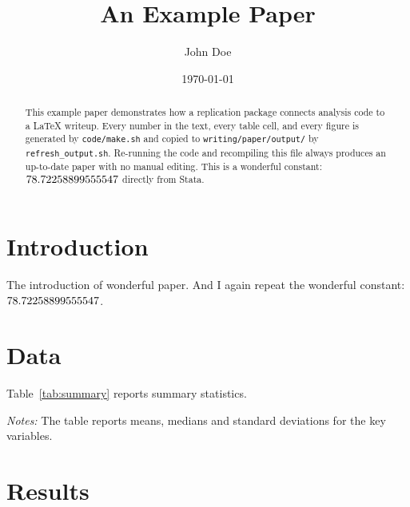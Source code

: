 \documentclass[12pt]{article}
\title{An Example Paper}
\author{John Doe}
\date{\today}
\begin{document}
\maketitle

\begin{abstract}
  This example paper demonstrates how a replication package connects
  analysis code to a \LaTeX{} writeup.
  Every number in the text, every table cell, and every figure is
  generated by \texttt{code/make.sh} and copied to
  \texttt{writing/paper/output/} by \texttt{refresh\_output.sh}.
  Re-running the code and recompiling this file always produces
  an up-to-date paper with no manual editing. This is a wonderful constant: $78.72258899555547$ directly from Stata.
\end{abstract}

\newpage

\section{Introduction}
\label{sec:intro}

The introduction of wonderful paper. And I again repeat the wonderful constant: $78.72258899555547$.


\section{Data}
\label{sec:data}

Table~\ref{tab:summary} reports summary statistics.
\begin{table}[H]
  \centering
  \caption{Summary Statistics}
  \label{tab:summary}
  
  \begin{flushleft}
    \footnotesize
    \textit{Notes:}
    The table reports means, medians and standard deviations for the
    key variables.
  \end{flushleft}
\end{table}


\section{Results}
\label{sec:results}
\end{document}
